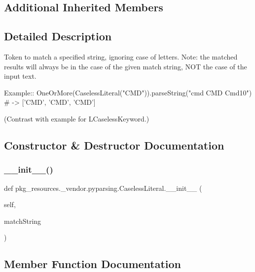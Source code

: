 \subsection*{Additional Inherited Members}


\subsection{Detailed Description}
\begin{DoxyVerb}Token to match a specified string, ignoring case of letters.
Note: the matched results will always be in the case of the given
match string, NOT the case of the input text.

Example::
    OneOrMore(CaselessLiteral("CMD")).parseString("cmd CMD Cmd10") # -> ['CMD', 'CMD', 'CMD']
    
(Contrast with example for L{CaselessKeyword}.)
\end{DoxyVerb}
 

\subsection{Constructor \& Destructor Documentation}
\mbox{\label{classpkg__resources_1_1__vendor_1_1pyparsing_1_1CaselessLiteral_a069f18375b91ce9c1e2aa530f02c3bfc}} 
\subsubsection{\texorpdfstring{\+\_\+\+\_\+init\+\_\+\+\_\+()}{\_\_init\_\_()}}
{\footnotesize\ttfamily def pkg\+\_\+resources.\+\_\+vendor.\+pyparsing.\+Caseless\+Literal.\+\_\+\+\_\+init\+\_\+\+\_\+ (\begin{DoxyParamCaption}\item[{}]{self,  }\item[{}]{match\+String }\end{DoxyParamCaption})}



\subsection{Member Function Documentation}
\mbox{\label{classpkg__resources_1_1__vendor_1_1pyparsing_1_1CaselessLiteral_aed18b36a50ecbdb395c5699bd4a9bb69}} 
